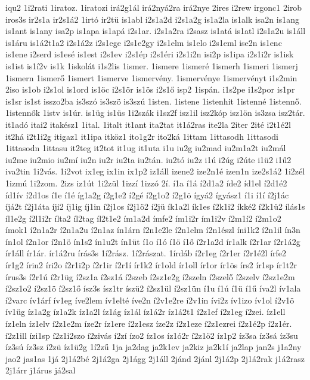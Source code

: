 {iqu2
1i2rati
1iratoz.
1iratozi
irá2g1ál
irá2nyá2ra
irá2nye
2ires
i2rew
irgonc1
2irob
iros3s
ir2s1a
ir2s1á2
1irtó
ir2tü
is1abl
i2s1a2d
i2s1a2g
is1a2la
is1alk
isa2n
is1ang
is1ant
is1any
isa2p
is1apa
is1apá
i2s1ar.
i2s1a2ra
i2sasz
is1atá
is1atl
i2s1a2u
is1áll
is1áru
is1á2t1a2
i2s1á2z
i2s1ege
i2s1e2gy
i2s1elm
is1elo
i2s1eml
ise2n
is1enc
is1ene
i2serd
is1esé
is1est
i2s1ev
i2s1ép
i2s1éri
i2s1i2n
isi2p
is1ipa
i2s1i2r
is1isk
is1ist
is1í2v
is1k
1iskolát
i1s2lis
1ismer.
1ismere
1ismeré
1ismerh
1ismeri
1ismerj
1ismern
1ismerő
1ismert
1ismerve
1ismervény.
1ismervénye
1ismervényt
i1s2min
2iso
is1ob
i2s1ol
is1ord
is1öc
i2s1ör
is1ös
i2s1ő
isp2
1ispán.
i1s2pe
i1s2por
is1pr
is1sr
is1st
isszo2ba
is3szó
is3szö
is3szú
1isten.
1istene
1istenhit
1istenné
1istennő.
1istennők
1istv
is1úr.
is1üg
is1üs
1i2szák
i1sz2f
isz1il
isz2kóp
isz1ön
is3zsa
isz2tár.
it1adó
itai2
itakész1
1ital.
1italt
it1ant
ita2tat
it1á2ras
ite2la
2iter
2ité
i2t1é2l
it2há
i2t1i2g
itigaz1
it1ipa
itköz1
ito1g2r
ito2ká
1ittam
1ittasodh
1ittasodi
1ittasodn
1ittasu
it2teg
it2tot
it1ug
it1uta
i1u
iu2g
iu2mad
iu2m1a2t
iu2mál
iu2me
iu2mio
iu2mí
iu2n
iu2r
iu2ta
iu2tán.
iu2tó
iu2z
i1ú
i2úg
i2úte
i1ü2
i1ű2
iva2tin
1i2vás.
1i2vot
ix1eg
ix1in
ix1p2
iz1áll
izene2
ize2n1é
izen1n
ize2s1á2
1i2zél
1izmú
1i2zom.
2izs
iz1út
1i2zül
1izzí
1izzó
2í.
í1a
í1á
í2d1a2
íde2
íd1el
í2d1é2
íd1ív
í2d1os
í1e
í1é
íg1a2g
í2g1e2
í2gé
í2g1o2
í2g1ö
ígyá2
ígyász1
í1i
í1í
í2j1ác
íjá2t
í2j1áta
íji2
íj1ig
íj1in
í2j1os
í2j1ö2
í2jü
ík1a2l
ík1es
í2k1i2
íkké2
í2k1ü2
ílás1s
íl1e2g
í2l1i2r
ílta2
íl2tag
íl2t1e2
ím1a2d
ímfe2
ím1i2r
ím1i2v
í2m1í2
í2m1o2
ímok1
í2n1a2r
í2n1a2u
í2n1az
ín1árn
í2n1e2le
í2n1elm
í2n1észl
íni1k2
í2n1il
ín3n
ín1ol
í2n1or
í2n1ö
ín1s2
ín1u2t
ín1üt
í1o
í1ó
í1ö
í1ő
í2r1a2d
ír1alk
í2r1ar
í2r1á2g
ír1áll
ír1ár.
ír1á2ru
írás3s
1í2rász.
1í2rászat.
1írdáb
í2r1eg
í2r1er
í2r1é2l
írfe2
ír1g2
írin2
íri2o
í2r1i2p
í2r1ir
í2r1í
ír1k2
ír1old
ír1oll
ír1or
ír1ös
írs2
ír1sp
ír1t2r
írus3s
í2r1ú
í2r1üg
í2sz1a
í2sz1á
í2szeb
í2sz1e2g
í2szeln
í2szelő
í2szelv
í2sz1e2m
í2sz1o2
í2sz1ö
í2sz1ő
ísz3s
ísz1tr
íszü2
í2sz1ül
í2sz1ün
í1u
í1ú
í1ü
í1ű
íva2l
ív1ala
í2varc
ív1árf
ív1eg
íve2lem
ív1elté
íve2n
í2v1e2re
í2v1in
ívi2z
ív1izo
ív1ol
í2v1ö
ív1üg
íz1a2g
íz1a2k
íz1a2l
íz1ág
íz1ál
íz1á2r
íz1á2t1
í2z1ef
í2z1eg
í2zei.
íz1ell
íz1eln
íz1elv
í2z1e2m
íze2r
íz1ere
í2z1esz
íze2z
í2z1eze
í2z1ezrei
í2z1é2p
í2z1ér.
í2z1ill
ízi1sp
í2z1i2szo
í2zivás
í2zí
ízo2
íz1os
íz1ó2r
í2z1ö2
íz1p2
íz3sa
íz3sá
íz3su
íz3sú
íz3sz
í2zü
íz1ü2g
1í2zű
1ja
ja2dag
ja2k1ev
ja2kiz
ja2k1í
ja2lap
jan2s
j1a2ny
jao2
jas1as
1já
2j1á2bé
2j1á2ga
2j1ágg
2j1áll
2jánd
2jánl
2j1á2p
2j1á2rak
j1á2rasz
2j1árr
j1árus
já2sal
}
